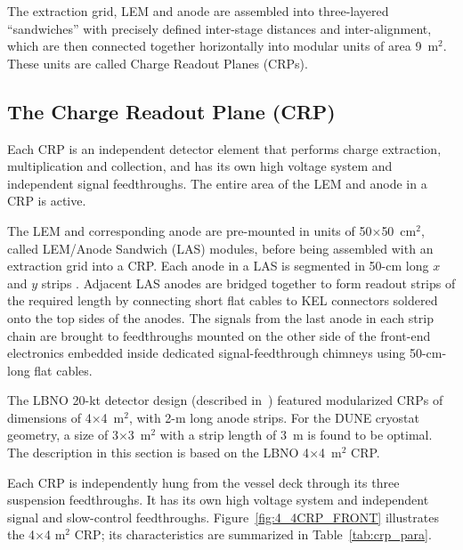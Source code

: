 The extraction grid, LEM and anode are assembled into three-layered ``sandwiches'' with precisely defined inter-stage distances and inter-alignment,  which are then connected together horizontally into
modular units of area \num{9}~m$^2$. These units are called Charge Readout Planes (CRPs).


\subsection{The Charge Readout Plane (CRP)}

Each CRP is an independent detector element that performs charge
extraction, multiplication and collection, and has its own high
voltage system and independent signal feedthroughs. The entire area of
the LEM and anode in a CRP is active.

The LEM and corresponding anode are pre-mounted in units of 50$\times$50~cm$^2$, called
LEM/Anode Sandwich (LAS) modules, before being assembled with an extraction
grid into a CRP. Each
anode in a LAS is segmented in 50-cm long $x$ and $y$ strips . Adjacent LAS anodes
are bridged together to form readout strips of the required length by
connecting short flat cables to KEL connectors soldered onto the top
sides of the anodes. The signals from the last anode in each 
strip chain are brought to feedthroughs
mounted on the other side of the front-end electronics embedded inside
dedicated signal-feedthrough chimneys using 50-cm-long flat cables.

The LBNO 20-kt detector design (described in~\cite{cdr-annex-lbno-2}) featured
modularized CRPs of dimensions of 4$\times$4~m$^2$, with 2-m long
anode strips. For the DUNE cryostat geometry, a size of 3$\times$3~m$^2$
with a strip length of 3~m is found to be optimal. The description in
this section is based on the LBNO 4$\times$4~m$^2$ CRP.

Each CRP is independently hung from the vessel deck through its three
suspension feedthroughs. It has its own high voltage system and 
independent signal and slow-control feedthroughs.
Figure~\ref{fig:4_4CRP_FRONT} illustrates the 4$\times$4 m$^2$ CRP;
its characteristics are summarized in Table~\ref{tab:crp_para}.


